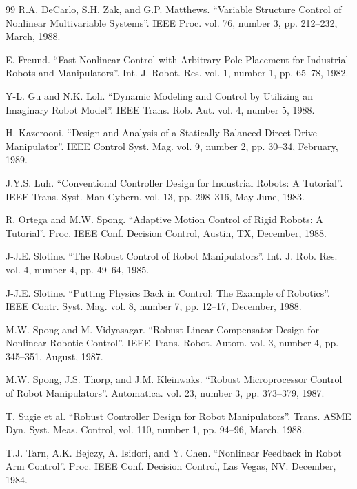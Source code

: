 \documentclass[UTF8,12pt,a4paper]{ctexart}
\begin{document}
\begin{thebibliography}{99}
R.A. DeCarlo, S.H. Zak, and G.P. Matthews.
``Variable Structure Control of Nonlinear Multivariable Systems''. IEEE Proc. vol. 76, number 3, pp. 212--232, March, 1988.

E. Freund.
``Fast Nonlinear Control with Arbitrary Pole-Placement for Industrial Robots and Manipulators''. Int. J. Robot. Res. vol. 1, number 1, pp. 65--78, 1982.

Y-L. Gu and N.K. Loh.
``Dynamic Modeling and Control by Utilizing an Imaginary Robot Model''. IEEE Trans. Rob. Aut. vol. 4, number 5, 1988.

H. Kazerooni.
``Design and Analysis of a Statically Balanced Direct-Drive Manipulator''. IEEE Control Syst. Mag. vol. 9, number 2, pp. 30--34, February, 1989.

J.Y.S. Luh.
``Conventional Controller Design for Industrial Robots: A Tutorial''. IEEE Trans. Syst. Man Cybern. vol. 13, pp. 298--316, May-June, 1983.

R. Ortega and M.W. Spong.
``Adaptive Motion Control of Rigid Robots: A Tutorial''. Proc. IEEE Conf. Decision Control, Austin, TX, December, 1988.

J-J.E. Slotine.
``The Robust Control of Robot Manipulators''. Int. J. Rob. Res. vol. 4, number 4, pp. 49--64, 1985.

J-J.E. Slotine.
``Putting Physics Back in Control: The Example of Robotics''. IEEE Contr. Syst. Mag. vol. 8, number 7, pp. 12--17, December, 1988.

M.W. Spong and M. Vidyasagar.
``Robust Linear Compensator Design for Nonlinear Robotic Control''. IEEE Trans. Robot. Autom. vol. 3, number 4, pp. 345--351, August, 1987.

M.W. Spong, J.S. Thorp, and J.M. Kleinwaks.
``Robust Microprocessor Control of Robot Manipulators''. Automatica. vol. 23, number 3, pp. 373--379, 1987.

T. Sugie et al.
``Robust Controller Design for Robot Manipulators''. Trans. ASME Dyn. Syst. Meas. Control, vol. 110, number 1, pp. 94--96, March, 1988.

T.J. Tarn, A.K. Bejczy, A. Isidori, and Y. Chen.
``Nonlinear Feedback in Robot Arm Control''. Proc. IEEE Conf. Decision Control, Las Vegas, NV. December, 1984.


\end{thebibliography}
\end{document}
